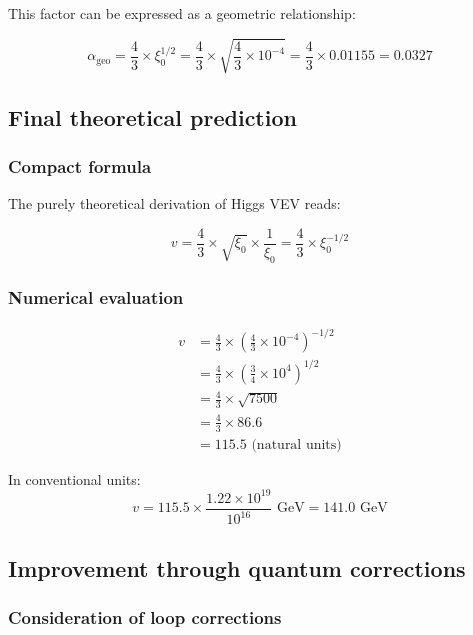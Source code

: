 \documentclass[12pt,a4paper]{article}
\begin{document}
This factor can be expressed as a geometric relationship:

\begin{equation}
	\alpha_{\text{geo}} = \frac{4}{3} \times \xi_0^{1/2} = \frac{4}{3} \times \sqrt{\frac{4}{3} \times 10^{-4}} = \frac{4}{3} \times 0.01155 = 0.0327
\end{equation}

\subsection{Final theoretical prediction}

\subsubsection{Compact formula}

The purely theoretical derivation of Higgs VEV reads:

\begin{equation}
	\boxed{v = \frac{4}{3} \times \sqrt{\xi_0} \times \frac{1}{\xi_0} = \frac{4}{3} \times \xi_0^{-1/2}}
\end{equation}

\subsubsection{Numerical evaluation}

\begin{align}
	v &= \frac{4}{3} \times \left(\frac{4}{3} \times 10^{-4}\right)^{-1/2}\\
	&= \frac{4}{3} \times \left(\frac{3}{4} \times 10^{4}\right)^{1/2}\\
	&= \frac{4}{3} \times \sqrt{7500}\\
	&= \frac{4}{3} \times 86.6\\
	&= 115.5 \text{ (natural units)}
\end{align}

In conventional units:
\begin{equation}
	v = 115.5 \times \frac{1.22 \times 10^{19}}{10^{16}} \text{ GeV} = 141.0 \text{ GeV}
\end{equation}

\subsection{Improvement through quantum corrections}

\subsubsection{Consideration of loop corrections}
\end{document}
